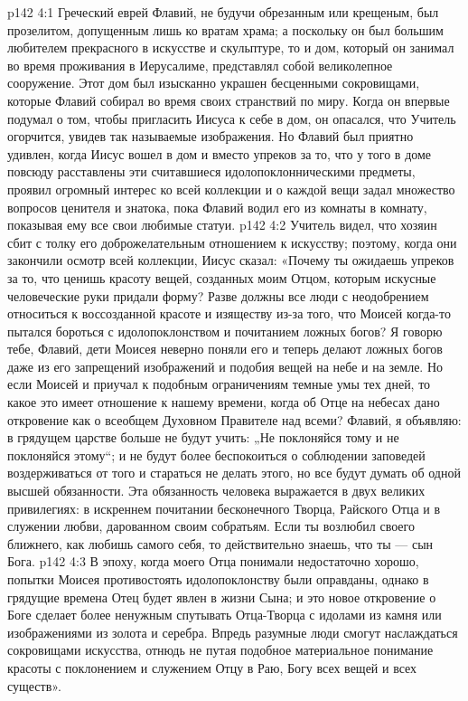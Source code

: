 \vs p142 4:1 Греческий еврей Флавий, не будучи обрезанным или крещеным, был прозелитом, допущенным лишь ко вратам храма; а поскольку он был большим любителем прекрасного в искусстве и скульптуре, то и дом, который он занимал во время проживания в Иерусалиме, представлял собой великолепное сооружение. Этот дом был изысканно украшен бесценными сокровищами, которые Флавий собирал во время своих странствий по миру. Когда он впервые подумал о том, чтобы пригласить Иисуса к себе в дом, он опасался, что Учитель огорчится, увидев так называемые изображения. Но Флавий был приятно удивлен, когда Иисус вошел в дом и вместо упреков за то, что у того в доме повсюду расставлены эти считавшиеся идолопоклонническими предметы, проявил огромный интерес ко всей коллекции и о каждой вещи задал множество вопросов ценителя и знатока, пока Флавий водил его из комнаты в комнату, показывая ему все свои любимые статуи.
\vs p142 4:2 Учитель видел, что хозяин сбит с толку его доброжелательным отношением к искусству; поэтому, когда они закончили осмотр всей коллекции, Иисус сказал: «Почему ты ожидаешь упреков за то, что ценишь красоту вещей, созданных моим Отцом, которым искусные человеческие руки придали форму? Разве должны все люди с неодобрением относиться к воссозданной красоте и изяществу из\hyp{}за того, что Моисей когда\hyp{}то пытался бороться с идолопоклонством и почитанием ложных богов? Я говорю тебе, Флавий, дети Моисея неверно поняли его и теперь делают ложных богов даже из его запрещений изображений и подобия вещей на небе и на земле. Но если Моисей и приучал к подобным ограничениям темные умы тех дней, то какое это имеет отношение к нашему времени, когда об Отце на небесах дано откровение как о всеобщем Духовном Правителе над всеми? Флавий, я объявляю: в грядущем царстве больше не будут учить: „Не поклоняйся тому и не поклоняйся этому“; и не будут более беспокоиться о соблюдении заповедей воздерживаться от того и стараться не делать этого, но все будут думать об одной высшей обязанности. Эта обязанность человека выражается в двух великих привилегиях: в искреннем почитании бесконечного Творца, Райского Отца и в служении любви, дарованном своим собратьям. Если ты возлюбил своего ближнего, как любишь самого себя, то действительно знаешь, что ты --- сын Бога.
\vs p142 4:3 В эпоху, когда моего Отца понимали недостаточно хорошо, попытки Моисея противостоять идолопоклонству были оправданы, однако в грядущие времена Отец будет явлен в жизни Сына; и это новое откровение о Боге сделает более ненужным спутывать Отца\hyp{}Творца с идолами из камня или изображениями из золота и серебра. Впредь разумные люди смогут наслаждаться сокровищами искусства, отнюдь не путая подобное материальное понимание красоты с поклонением и служением Отцу в Раю, Богу всех вещей и всех существ».
